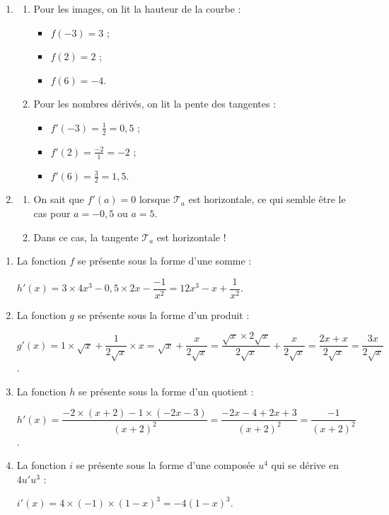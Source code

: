 \documentclass[a4paper,11pt]{article}
\begin{document}
\pagebreak


\begin{enumerate}
	\item 
	\begin{enumerate}
		\item Pour les images, on lit la \og hauteur \fg{} de la courbe :
		\begin{itemize}
			\item $f(-3)=3$ ;
			\item $f(2)=2$ ;
			\item $f(6)=-4$.
		\end{itemize}
		\item Pour les nombres dérivés, on lit la \og pente \fg{} des tangentes :
		\begin{itemize}
			\item $f'(-3)=\tfrac{1}{2}=0,5$ ;
			\item $f'(2)=\tfrac{-2}{1}=-2$ ;
			\item $f'(6)=\tfrac{3}{2}=1,5$.
		\end{itemize}
	\end{enumerate}
	\item 
	\begin{enumerate}
		\item On sait que $f'(a)=0$ lorsque $\mathscr{T}_a$ est horizontale, ce qui semble être le cas pour $a=-0,5$ ou $a=5$.
		\item Dans ce cas, la tangente $\mathscr{T}_a$ est horizontale !
	\end{enumerate}
\end{enumerate}

\medskip


\begin{enumerate}
	\item La fonction $f$ se présente sous la forme d'une somme :
	
	\hspace{0.5cm}$h'(x)=3 \times 4x^3-0,5 \times 2x- \dfrac{-1}{x^2} = 12x^3-x+\dfrac{1}{x^2}$.
	\item La fonction $g$ se présente sous la forme d'un produit :
	
	\hspace{0.5cm}$g'(x)=1 \times \sqrt{x} + \dfrac{1}{2\sqrt{x}} \times x = \sqrt{x} + \dfrac{x}{2\sqrt{x}} = \dfrac{\sqrt{x} \times 2\sqrt{x}}{2\sqrt{x}} + \dfrac{x}{2\sqrt{x}} = \dfrac{2x+x}{2\sqrt{x}}=\dfrac{3x}{2\sqrt{x}}$.
	\item La fonction $h$ se présente sous la forme d'un quotient :
	
	\hspace{0.5cm}$h'(x)=\dfrac{-2\times(x+2)-1\times(-2x-3)}{(x+2)^2}=\dfrac{-2x-4+2x+3}{(x+2)^2}=\dfrac{-1}{(x+2)^2}$.
	\item La fonction $i$ se présente sous la forme d'une composée $u^4$ qui se dérive en $4u'u^3$ :
	
	\hspace{0.5cm}$i'(x)=4 \times (-1) \times (1-x)^3 = -4(1-x)^3$.
\end{enumerate}
\end{document}
